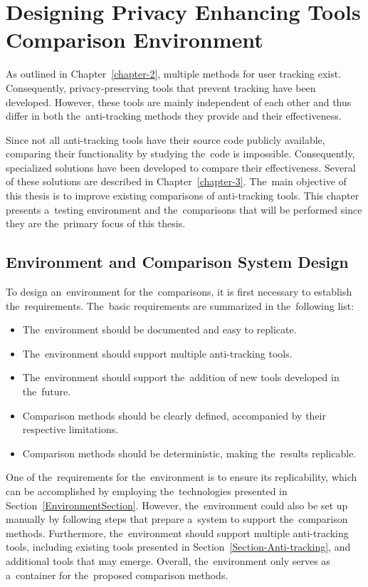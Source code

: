 \chapter{Designing Privacy Enhancing Tools Comparison Environment}
\label{chapter-4}

As outlined in Chapter~\ref{chapter-2}, multiple methods for user tracking exist. Consequently, privacy-preserving tools that prevent tracking have been developed. However, these tools are mainly independent of each other and thus differ in both the~anti-tracking methods they provide and their effectiveness.

Since not all anti-tracking tools have their source code publicly available, comparing their functionality by studying the~code is impossible.
Consequently, specialized solutions have been developed to compare their effectiveness. Several of these solutions are described in Chapter~\ref{chapter-3}. The~main objective of this thesis is to improve existing comparisons of anti-tracking tools. This chapter presents a~testing environment and the~comparisons that will be performed since they are the~primary focus of this thesis.

\section{Environment and Comparison System Design}

To design an~environment for the~comparisons, it is first necessary to establish the~requirements. The~basic requirements are summarized in the~following list:

\begin{itemize}
    \setlength\itemsep{0em}
    \item The~environment should be documented and easy to replicate.
    \item The~environment should support multiple anti-tracking tools.
    \item The~environment should support the~addition of new tools developed in the~future.
    \item Comparison methods should be clearly defined, accompanied by their respective limitations.
    \item Comparison methods should be deterministic, making the~results replicable.
\end{itemize}

One of the~requirements for the~environment is to ensure its replicability, which can be accomplished by employing the~technologies presented in Section~\ref{EnvironmentSection}. However, the~environment could also be set up manually by following steps that prepare a~system to support the~comparison methods. Furthermore, the~environment should support multiple anti-tracking tools, including existing tools presented in Section~\ref{Section-Anti-tracking}, and additional tools that may emerge. Overall, the~environment only serves as a~container for the~proposed comparison methods.

